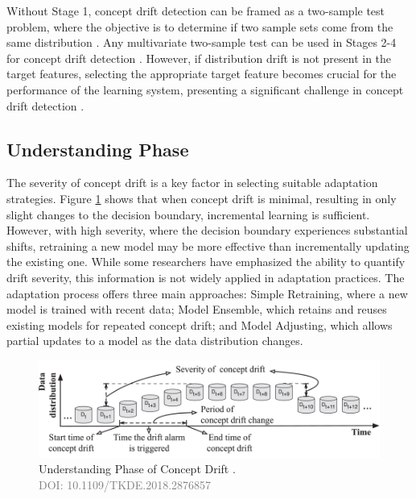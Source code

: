 Without Stage 1, concept drift detection can be framed as a two-sample test problem, where the objective is to determine if two sample sets come from the same distribution \cite{dries2009adaptive}. Any multivariate two-sample test can be used in Stages 2-4 for concept drift detection \cite{dries2009adaptive}. However, if distribution drift is not present in the target features, selecting the appropriate target feature becomes crucial for the performance of the learning system, presenting a significant challenge in concept drift detection \cite{yamada2013change}.

\subsection{Understanding Phase}
The severity of concept drift is a key factor in selecting suitable adaptation strategies. Figure \ref{fig:concept-drift-understanding} shows that when concept drift is minimal, resulting in only slight changes to the decision boundary, incremental learning is sufficient. However, with high severity, where the decision boundary experiences substantial shifts, retraining a new model may be more effective than incrementally updating the existing one. While some researchers have emphasized the ability to quantify drift severity, this information is not widely applied in adaptation practices. The adaptation process offers three main approaches: Simple Retraining, where a new model is trained with recent data; Model Ensemble, which retains and reuses existing models for repeated concept drift; and Model Adjusting, which allows partial updates to a model as the data distribution changes.
\vspace{-3mm}
\begin{figure}[H]
    \centering
    \includegraphics[width=.9\textwidth]{2_Background/figures/concept_drift_understanding.png}
    \caption{Understanding Phase of Concept Drift \cite{8496795}. \\ \textcolor{gray}{\fontsize{10}{0}\selectfont DOI: 10.1109/TKDE.2018.2876857}}
    \label{fig:concept-drift-understanding}
\end{figure}
\vspace{-6mm}

